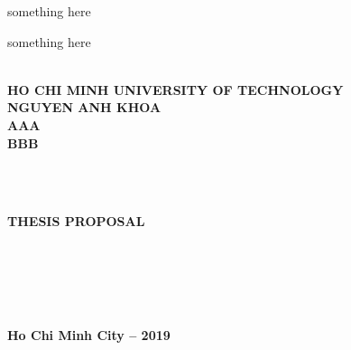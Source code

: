 \begin{titlepage}
    \vspace*{-0.7cm}
    \begin{center}
        \begin{minipage}{0.45\textwidth}
            \begin{flushleft}
                something here
            \end{flushleft}
        \end{minipage}
        \begin{minipage}{0.45\textwidth}
            \begin{flushright}
                something here
            \end{flushright}
        \end{minipage}
        \\[0.04cm]
        {\bfseries HO CHI MINH UNIVERSITY OF TECHNOLOGY }\\[4.1cm]

        {\large \bfseries NGUYEN ANH KHOA}\\[2.1cm]


        { \bfseries \large AAA\\[0.0cm] BBB }\\[0.7cm]
    \end{center}
    \hspace*{2.7cm}{\large Major: Computer Science}\\[0.0cm]
    \hspace*{2.7cm}{\large Student ID: 1611617}\\[0.0cm]
    \begin{center}
        {\bfseries THESIS PROPOSAL }\\[0.7cm]
    \end{center}
    \hspace*{6.7cm}{\bfseries INSTRUCTORS:}\\[0.1cm]
    \hspace*{7.9cm}{ 1. NGUYEN AN KHUONG}\\[0.0cm]
    \hspace*{7.9cm}{ 2. ?? NGUYEN LE THANH}\\[3.6cm]
    \hspace*{7.9cm}{ 3. ?? NGUYEN QUOC BAO}\\[3.6cm]
    \begin{center}

        {\bfseries Ho Chi Minh City -- 2019}
    \end{center}
\end{titlepage}
